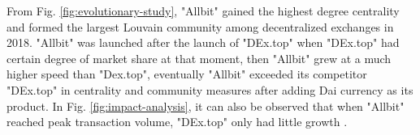 From Fig. \ref{fig:evolutionary-study}, "Allbit" gained the highest degree centrality and formed the largest Louvain community among decentralized exchanges in 2018. "Allbit" was launched after the launch of "DEx.top" when "DEx.top" had certain degree of market share at that moment, then "Allbit" grew at a much higher speed than "Dex.top", eventually "Allbit" exceeded its competitor "DEx.top" in centrality and community measures after adding Dai currency as its product. In Fig. \ref{fig:impact-analysis}, it can also be observed that when "Allbit" reached peak transaction volume, "DEx.top" only had little growth \cite{23}.



